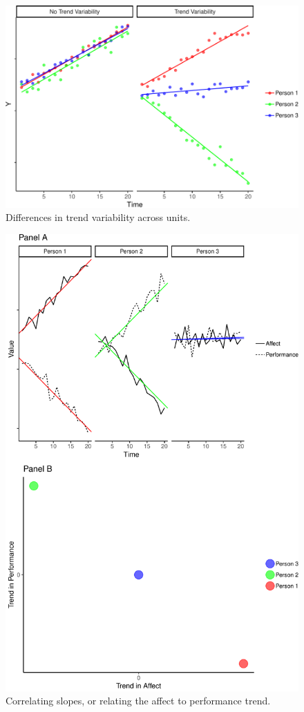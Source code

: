 \documentclass[english,,man]{apa6}
\theoremstyle{definition}
\theoremstyle{definition}
\theoremstyle{definition}
\theoremstyle{remark}
\begin{document}
\begin{figure}
\centering
\includegraphics{figures/unnamed-chunk-13-1.pdf}
\caption{\label{fig:unnamed-chunk-13}Differences in trend variability across
units.\label{trend_var}}
\end{figure}

\begin{figure}
\centering
\includegraphics{figures/unnamed-chunk-14-1.pdf}
\caption{\label{fig:unnamed-chunk-14}Correlating slopes, or relating the
affect to performance trend.\label{trend_correlation}}
\end{figure}
\end{document}

